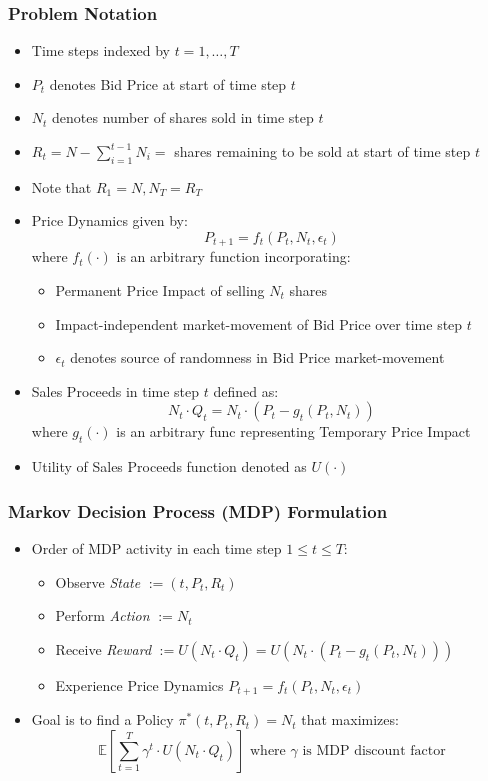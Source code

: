 \documentclass[handout]{beamer}
\begin{document}
\begin{frame}
\frametitle{Problem Notation}
\pause
\begin{itemize}[<+->]
\item Time steps indexed by $t = 1, \ldots, T$
\item $P_t$ denotes Bid Price at start of time step $t$
\item $N_t$ denotes number of shares sold in time step $t$
\item $R_t = N - \sum_{i=1}^{t-1}N_i = $ shares remaining to be sold at start of time step $t$
\item Note that $R_1 = N, N_T = R_T$
\item Price Dynamics given by:
$$P_{t+1} = f_t(P_t, N_t, \epsilon_t)$$
where $f_t(\cdot)$ is an arbitrary function incorporating:
\begin{itemize}
\item Permanent Price Impact of selling $N_t$ shares
\item Impact-independent market-movement of Bid Price over time step $t$
\item $\epsilon_t$ denotes source of randomness in Bid Price market-movement
\end{itemize}
\item Sales Proceeds in time step $t$ defined as:
$$N_t \cdot Q_t = N_t \cdot (P_t - g_t(P_t, N_t))$$
where $g_t(\cdot)$ is an arbitrary func representing Temporary Price Impact
\item Utility of Sales Proceeds function denoted as $U(\cdot)$
\end{itemize}
\end{frame}

\begin{frame}
\frametitle{Markov Decision Process (MDP) Formulation}
\pause
\begin{itemize}[<+->]
\item Order of MDP activity in each time step $1 \leq t \leq T$:
\begin{itemize}
\item Observe {\em State} $:= (t, P_t, R_t)$
\item Perform {\em Action} $:= N_t$
\item Receive {\em Reward} $:= U(N_t \cdot Q_t) = U(N_t \cdot (P_t - g_t(P_t, N_t)))$
\item Experience Price Dynamics $P_{t+1} = f_t(P_t, N_t, \epsilon_t)$
\end{itemize}
\item Goal is to find a Policy $\pi^*(t, P_t, R_t) = N_t$ that maximizes: $$\mathbb{E}[\sum_{t=1}^T \gamma^t \cdot U(N_t \cdot Q_t)] \mbox{ where } \gamma \mbox{ is MDP discount factor}$$
\end{itemize}
\end{frame}
\end{document}
